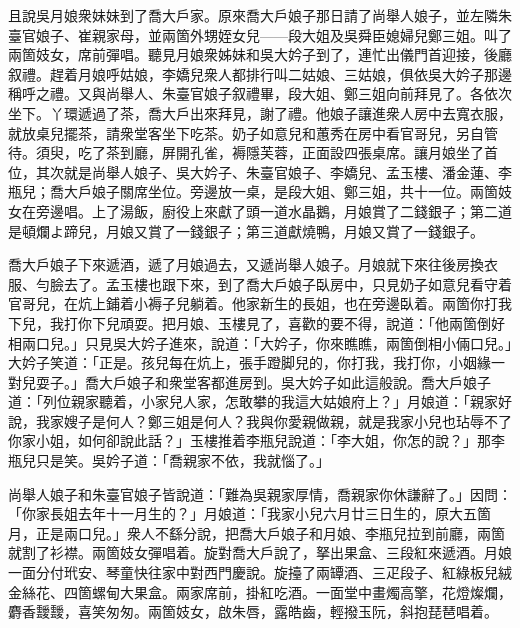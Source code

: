 且說吳月娘衆妹妹到了喬大戶家。原來喬大戶娘子那日請了尚舉人娘子，並左隣朱臺官娘子、崔親家母，並兩箇外甥姪女兒——段大姐及吳舜臣媳婦兒鄭三姐。叫了兩箇妓女，席前彈唱。聽見月娘衆姊妹和吳大妗子到了，連忙出儀門首迎接，後廳叙禮。趕着月娘呼姑娘，李嬌兒衆人都排行叫二姑娘、三姑娘，俱依吳大妗子那邊稱呼之禮。又與尚舉人、朱臺官娘子叙禮畢，段大姐、鄭三姐向前拜見了。各依次坐下。丫環遞過了茶，喬大戶出來拜見，謝了禮。他娘子讓進衆人房中去寬衣服，就放桌兒擺茶，請衆堂客坐下吃茶。奶子如意兒和蕙秀在房中看官哥兒，另自管待。須臾，吃了茶到廳，屏開孔雀，褥隱芙蓉，正面設四張桌席。讓月娘坐了首位，其次就是尚舉人娘子、吳大妗子、朱臺官娘子、李嬌兒、孟玉樓、潘金蓮、李瓶兒；喬大戶娘子關席坐位。旁邊放一桌，是段大姐、鄭三姐，共十一位。兩箇妓女在旁邊唱。上了湯飯，廚役上來獻了頭一道水晶鵝，月娘賞了二錢銀子；第二道是頓爛よ蹄兒，月娘又賞了一錢銀子；第三道獻燒鴨，月娘又賞了一錢銀子。

喬大戶娘子下來遞酒，遞了月娘過去，又遞尚舉人娘子。月娘就下來往後房換衣服、勻臉去了。孟玉樓也跟下來，到了喬大戶娘子臥房中，只見奶子如意兒看守着官哥兒，在炕上鋪着小褥子兒躺着。他家新生的長姐，也在旁邊臥着。兩箇你打我下兒，我打你下兒頑耍。{}把月娘、玉樓見了，喜歡的要不得，說道：「他兩箇倒好相兩口兒。」只見吳大妗子進來，說道：「大妗子，你來瞧瞧，兩箇倒相小倆口兒。」大妗子笑道：「正是。孩兒每在炕上，張手蹬脚兒的，你打我，我打你，小姻緣一對兒耍子。」喬大戶娘子和衆堂客都進房到。吳大妗子如此這般說。喬大戶娘子道：「列位親家聽着，小家兒人家，怎敢攀的我這大姑娘府上？」月娘道：「親家好說，我家嫂子是何人？鄭三姐是何人？我與你愛親做親，就是我家小兒也玷辱不了你家小姐，如何卻說此話？」玉樓推着李瓶兒說道：「李大姐，你怎的說？」那李瓶兒只是笑。{}吳妗子道：「喬親家不依，我就惱了。」

尚舉人娘子和朱臺官娘子皆說道：「難為吳親家厚情，喬親家你休謙辭了。」因問：「你家長姐去年十一月生的？」月娘道：「我家小兒六月廿三日生的，原大五箇月，正是兩口兒。」衆人不繇分說，把喬大戶娘子和月娘、李瓶兒拉到前廳，兩箇就割了衫襟。兩箇妓女彈唱着。旋對喬大戶說了，拏出果盒、三段紅來遞酒。月娘一面分付玳安、琴童快往家中對西門慶說。旋擡了兩罈酒、三疋段子、紅綠板兒絨金絲花、四箇螺甸大果盒。兩家席前，掛紅吃酒。一面堂中畫燭高擎，花燈燦爛，麝香靉靉，喜笑匆匆。兩箇妓女，啟朱唇，露皓齒，輕撥玉阮，斜抱琵琶唱着。

